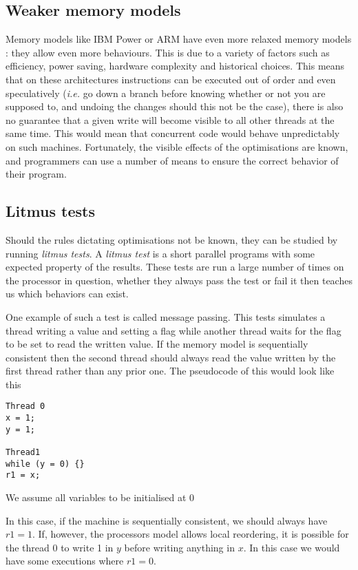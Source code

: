 \documentclass[a4,11pt,dvipsnames]{article}
\begin{document}
\subsection{Weaker memory models}

Memory models like IBM Power or ARM have even more relaxed memory models : they allow even more behaviours. This is due to a variety of factors such as efficiency, power saving, hardware complexity and historical choices. This means that on these architectures instructions can be executed out of order and even speculatively (\emph{i.e.} go down a branch before knowing whether or not you are supposed to, and undoing the changes should this not be the case), there is also no guarantee that a given write will become visible to all other threads at the same time. This would mean that concurrent code would behave unpredictably on such machines. Fortunately, the visible effects of the optimisations are known, and programmers can use a number of means to ensure the correct behavior of their program.

\subsection{Litmus tests}

Should the rules dictating optimisations not be known, they can be studied by running \emph{litmus tests}. A \emph{litmus test} is a short parallel programs with some expected property of the results. These tests are run a large number of times on the processor in question, whether they always pass the test or fail it then teaches us which behaviors can exist.

One example of such a test is called message passing. This tests simulates a thread writing a value and setting a flag while another thread waits for the flag to be set to read the written value. If the memory model is sequentially consistent then the second thread should always read the value written by the first thread rather than any prior one. The pseudocode of this would look like this

\begin{lstlisting}
Thread 0
x = 1;
y = 1;

Thread1
while (y = 0) {}
r1 = x;
\end{lstlisting}

{\footnotesize{We assume all variables to be initialised at 0}}

In this case, if the machine is sequentially consistent, we should always have $r1 = 1$. If, however, the processors model allows local reordering, it is possible for the thread 0 to write 1 in $y$ before writing anything in $x$. In this case we would have some executions where $r1 = 0$.
\end{document}
